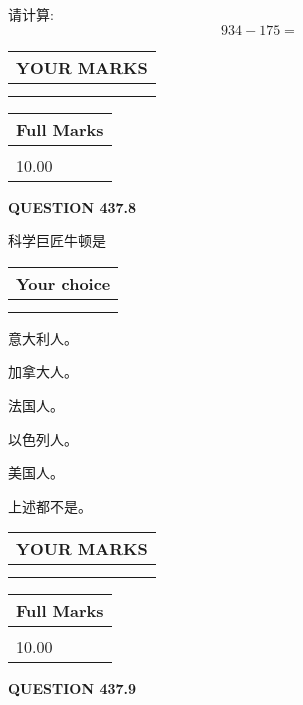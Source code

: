 \documentclass{ctexart}
\begin{document}
  
 
请计算:
\begin{equation}
934 -   %
175 = \nonumber
\end{equation}
 

 

 
  
\vspace{0.2in}
  
\noindent\begin{tabular}{|l|}
\hline
 YOUR MARKS  \\
\hline
 \\ 
 \\ 
\hline
\end{tabular}
\hspace{0.05in} \begin{tabular}{|l|}
\hline
 Full Marks  \\
\hline
 \\ 
10.00 \\
\hline
\end{tabular}
{\textbf{\Large{QUESTION
437.8 
}}}
  
  
科学巨匠牛顿是
  
  
\noindent\hspace{3.0in} \begin{tabular}{|l|}
\hline
Your choice \\
\hline
 \\ 
 \\ 
\hline
\end{tabular}
  
  
 
 
意大利人。
 
 
加拿大人。
 
 
法国人。
 
 
以色列人。
 
 
美国人。
 
 
 上述都不是。
 
 
  
\vspace{0.2in}
  
\noindent\begin{tabular}{|l|}
\hline
 YOUR MARKS  \\
\hline
 \\ 
 \\ 
\hline
\end{tabular}
\hspace{0.05in} \begin{tabular}{|l|}
\hline
 Full Marks  \\
\hline
 \\ 
10.00 \\
\hline
\end{tabular}
{\textbf{\Large{QUESTION
437.9 
}}}
  
\end{document}

